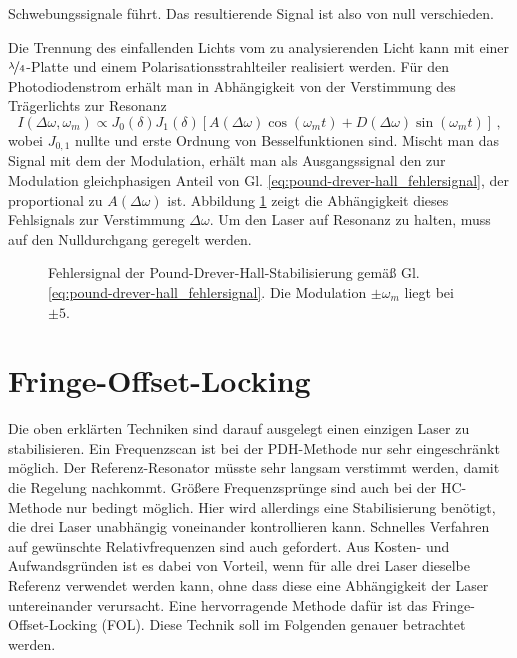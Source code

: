Schwebungssignale führt. Das resultierende Signal ist also von null
verschieden.\par
Die Trennung des einfallenden Lichts vom zu analysierenden Licht kann mit einer
$\nicefrac{\lambda}{4}$-Platte und einem Polarisationsstrahlteiler realisiert
werden. Für den Photodiodenstrom erhält man in Abhängigkeit von der Verstimmung
des Trägerlichts zur Resonanz
\begin{equation}\label{eq:pound-drever-hall_fehlersignal}
	I(\Delta\omega,\omega_m)\propto
	J_0(\delta)J_1(\delta)\left[A(\Delta\omega)\cos{(\omega_mt)}+D(\Delta\omega)\sin{(\omega_mt)}\right]\,,
\end{equation}
wobei $J_{0,1}$ nullte und erste Ordnung von Besselfunktionen sind. Mischt man
das Signal mit dem der Modulation, erhält man als Ausgangssignal den zur
Modulation gleichphasigen Anteil von
Gl. \eqref{eq:pound-drever-hall_fehlersignal}, der proportional zu
$A(\Delta\omega)$ ist.
Abbildung \ref{fig:pound-drever-hall_fehlersignal} zeigt die Abhängigkeit dieses
Fehlsignals zur Verstimmung $\Delta\omega$. Um den Laser auf Resonanz zu halten,
muss auf den Nulldurchgang geregelt werden.
\begin{figure}[h]
	\centering
	\footnotesize
	
	\caption[Hänsch-Couillaud - Fehlersignal]{Fehlersignal der
	Pound-Drever-Hall-Stabilisierung
	gemäß Gl.
	\eqref{eq:pound-drever-hall_fehlersignal}. Die Modulation 
	$\pm\omega_m$ liegt bei $\pm5$.}\label{fig:pound-drever-hall_fehlersignal}
\end{figure}

\section{Fringe-Offset-Locking}\label{sec:fringe-offset-locking}
Die oben erklärten Techniken sind darauf ausgelegt einen einzigen Laser zu
stabilisieren. Ein Frequenzscan ist bei der PDH-Methode nur sehr eingeschränkt
möglich. Der Referenz-Resonator müsste sehr langsam verstimmt werden, damit die
Regelung nachkommt. Größere Frequenzsprünge sind auch bei der HC-Methode
nur bedingt möglich. Hier wird allerdings eine Stabilisierung benötigt, die drei
Laser unabhängig voneinander kontrollieren kann. Schnelles Verfahren auf
gewünschte Relativfrequenzen sind auch gefordert. Aus Kosten- und
Aufwandsgründen ist es dabei von Vorteil, wenn für alle drei Laser dieselbe
Referenz verwendet werden kann, ohne dass diese eine Abhängigkeit der Laser
untereinander verursacht. Eine hervorragende Methode dafür ist das
Fringe-Offset-Locking (FOL). Diese Technik soll im Folgenden genauer betrachtet
werden.

